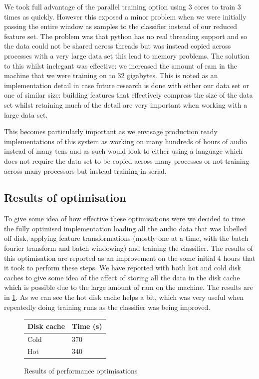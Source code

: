 \documentclass[ %
                    author={Sam Phippen},
                supervisor={Dr. Rafal Bogacz},
                     title={Real time voice activity detectors in noisy personal computing environments},
                  subtitle={},
                    degree={MEng},
                      year={2012} ]{thesis}
\begin{document}
We took full advantage of the parallel training option using 3 cores to train 3
times as quickly. However this exposed a minor problem when we were initially
passing the entire window as samples to the classifier instead of our reduced
feature set. The problem was that python has no real threading support and so
the data could not be shared across threads but was instead copied across
processes with a very large data set this lead to memory problems. The solution
to this whilst inelegant was effective: we increased the amount of ram in the
machine that we were training on to 32 gigabytes. This is noted as an
implementation detail in case future research is done with either our data set
or one of similar size: building features that effectively compress the size of
the data set whilst retaining much of the detail are very important when
working with a large data set.

This becomes particularly important as we envisage production ready
implementations of this system as working on many hundreds of hours of audio
instead of many tens and as such would look to either using a language which
does not require the data set to be copied across many processes or not training
across many processors but instead training in serial.

\subsection{Results of optimisation}

To give some idea of how effective these optimisations were we decided to time
the fully optimised implementation loading all the audio data that was labelled
off disk, applying feature transformations (mostly one at a time, with the
batch fourier transform and batch windowing) and training the classifier. The
results of this optimisation are reported as an improvement on the some initial
4 hours that it took to perform these steps. We have reported with both hot and
cold disk caches to give some idea of the affect of storing all the data in the
disk cache which is possible due to the large amount of ram on the machine.
The results are in \ref{table:optimisation-results}. As we can see the hot disk
cache helps a bit, which was very useful when repeatedly doing training runs as
the classifier was being improved.

\begin{figure}
    \begin{tabular}{|l|l|}
        Disk cache & Time (s) \\ \hline
        Cold & 370 \\
        Hot &  340 \\
    \end{tabular}
    \caption{Results of performance optimisations}

    \label{table:optimisation-results}
\end{figure}
\end{document}
